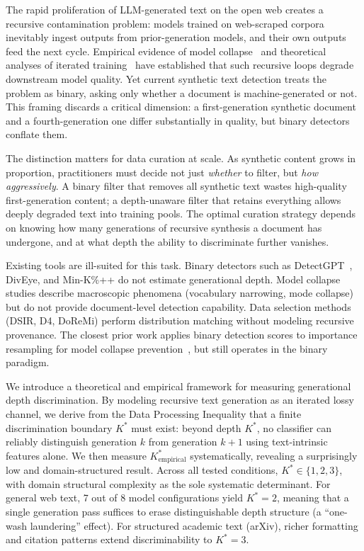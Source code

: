 \documentclass[11pt,a4paper]{article}
\begin{document}
The rapid proliferation of LLM-generated text on the open web creates a recursive contamination problem: models trained on web-scraped corpora inevitably ingest outputs from prior-generation models, and their own outputs feed the next cycle. Empirical evidence of model collapse~\citep{shumailov2024model} and theoretical analyses of iterated training~\citep{alemohammad2024selfconsuming,dohmatob2024tale} have established that such recursive loops degrade downstream model quality. Yet current synthetic text detection treats the problem as binary, asking only whether a document is machine-generated or not. This framing discards a critical dimension: a first-generation synthetic document and a fourth-generation one differ substantially in quality, but binary detectors conflate them.

The distinction matters for data curation at scale. As synthetic content grows in proportion, practitioners must decide not just \emph{whether} to filter, but \emph{how aggressively}. A binary filter that removes all synthetic text wastes high-quality first-generation content; a depth-unaware filter that retains everything allows deeply degraded text into training pools. The optimal curation strategy depends on knowing how many generations of recursive synthesis a document has undergone, and at what depth the ability to discriminate further vanishes.

Existing tools are ill-suited for this task. Binary detectors such as DetectGPT~\citep{mitchell2023detectgpt}, DivEye, and Min-K\%++ do not estimate generational depth. Model collapse studies describe macroscopic phenomena (vocabulary narrowing, mode collapse) but do not provide document-level detection capability. Data selection methods (DSIR, D4, DoReMi) perform distribution matching without modeling recursive provenance. The closest prior work applies binary detection scores to importance resampling for model collapse prevention~\citep{drayson2025detecting}, but still operates in the binary paradigm.

We introduce a theoretical and empirical framework for measuring generational depth discrimination. By modeling recursive text generation as an iterated lossy channel, we derive from the Data Processing Inequality that a finite discrimination boundary $K^*$ must exist: beyond depth $K^*$, no classifier can reliably distinguish generation $k$ from generation $k{+}1$ using text-intrinsic features alone. We then measure $K^*_{\text{empirical}}$ systematically, revealing a surprisingly low and domain-structured result. Across all tested conditions, $K^* \in \{1, 2, 3\}$, with domain structural complexity as the sole systematic determinant. For general web text, 7 out of 8 model configurations yield $K^*{=}2$, meaning that a single generation pass suffices to erase distinguishable depth structure (a ``one-wash laundering'' effect). For structured academic text (arXiv), richer formatting and citation patterns extend discriminability to $K^*{=}3$.
\end{document}
